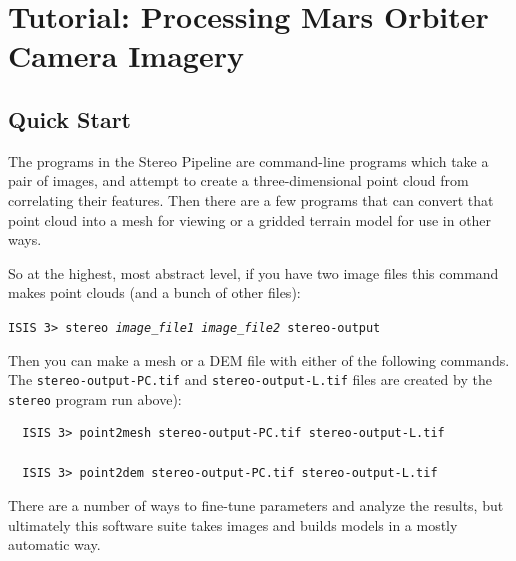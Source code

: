 \chapter{Tutorial: Processing Mars Orbiter Camera Imagery}
\label{ch:tutorial}

\section{Quick Start}

The programs in the Stereo Pipeline are command-line programs which
take a pair of images, and attempt to create a three-dimensional
point cloud from correlating their features.  Then there are a few
programs that can convert that point cloud into a mesh for viewing
or a gridded terrain model for use in other ways.

So at the highest, most abstract level, if you have two image files
this command makes point clouds (and a bunch of other files):

\hspace{12pt}\texttt{ISIS 3> stereo \textit{image\_file1 image\_file2} stereo-output}
\smallskip

Then you can make a mesh or a \ac{DEM} file with either of the following
commands.  The \texttt{stereo-output-PC.tif} and
\texttt{stereo-output-L.tif} files are created by the \texttt{stereo}
program run above):

\begin{verbatim}
  ISIS 3> point2mesh stereo-output-PC.tif stereo-output-L.tif

  ISIS 3> point2dem stereo-output-PC.tif stereo-output-L.tif
\end{verbatim}
\noindent
There are a number of ways to fine-tune parameters and
analyze the results, but ultimately this software suite takes images
and builds models in a mostly automatic way.


